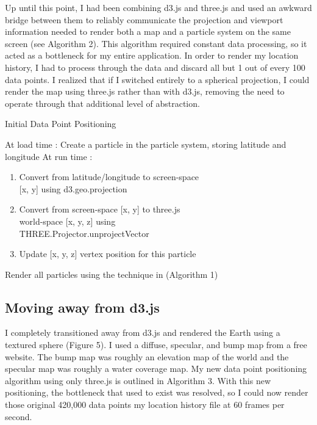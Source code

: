 \documentclass[conference]{acmsiggraph}
\begin{document}
Up until this point, I had been combining d3.js and three.js and used an awkward
bridge between them to reliably communicate the projection and viewport
information needed to render both a map and a particle system on the same
screen (see Algorithm 2). This algorithm required constant data processing, so
it acted as a bottleneck for my entire application. In order to render my
location history, I had to process through the data and discard all but 1 out of
every 100 data points. I realized that if I switched entirely to a spherical
projection, I could render the map using three.js rather than with d3.js,
removing the need to operate through that additional level of abstraction.

\begin{algorithm}
\DontPrintSemicolon
\caption{Initial Data Point Positioning}
    At load time :  {
        Create a particle in the particle system, storing latitude and longitude
    }
    At run time :  {
         {
            \begin{enumerate}
                \item Convert from latitude/longitude to screen-space \\
                    {[}x, y{]} using d3.geo.projection
                \item Convert from screen-space {[}x, y{]} to three.js \\
                    world-space {[}x, y, z{]} using \\
                    THREE.Projector.unprojectVector
                \item Update {[}x, y, z{]} vertex position for this particle
            \end{enumerate}
        }
        Render all particles using the technique in (Algorithm 1)
    }
\end{algorithm}

\subsection{Moving away from d3.js}

I completely transitioned away from d3.js and rendered the Earth using a
textured sphere (Figure 5). I used a diffuse, specular, and bump map from a free
website. The bump map was roughly an elevation map of the world and the specular
map was roughly a water coverage map. My new data point positioning algorithm
using only three.js is outlined in Algorithm 3. With this new positioning,
the bottleneck that used to exist was resolved, so I could now render those
original 420,000 data points my location history file at 60 frames per second.
\end{document}
